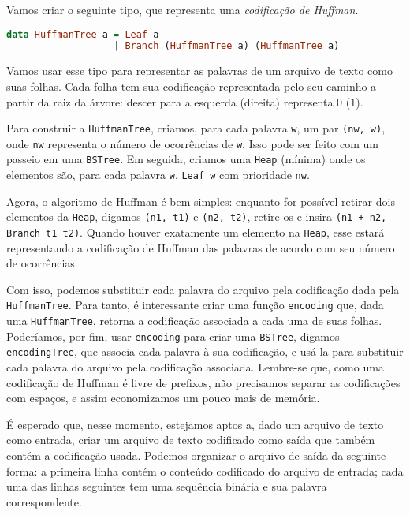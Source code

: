\documentclass[a4paper]{article}
\begin{document}
Vamos criar o seguinte tipo, que representa uma \emph{codificação de Huffman}.

\begin{lstlisting}[language=haskell, frame=single]
data HuffmanTree a = Leaf a
                   | Branch (HuffmanTree a) (HuffmanTree a)
\end{lstlisting}

Vamos usar esse tipo para representar as palavras de um arquivo de texto como suas folhas.
Cada folha tem sua codificação representada pelo seu caminho a partir da raiz da árvore:
descer para a esquerda (direita) representa $0$ ($1$).

Para construir a \texttt{HuffmanTree}, criamos, para cada palavra \texttt{w}, um par \texttt{(nw, w)}, onde \texttt{nw} representa o número de ocorrências de \texttt{w}.
Isso pode ser feito com um passeio em uma \texttt{BSTree}.
Em seguida, criamos uma \texttt{Heap} (mínima) onde os elementos são, para cada palavra \texttt{w}, \texttt{Leaf w} com prioridade \texttt{nw}.

Agora, o algoritmo de Huffman é bem simples: enquanto for possível retirar dois elementos da \texttt{Heap}, digamos \texttt{(n1, t1)} e \texttt{(n2, t2)}, retire-os e insira \texttt{(n1 + n2, Branch t1 t2)}.
Quando houver exatamente um elemento na \texttt{Heap}, esse estará representando a codificação de Huffman das palavras de acordo com seu número de ocorrências.

Com isso, podemos substituir cada palavra do arquivo pela codificação dada pela \texttt{HuffmanTree}.
Para tanto, é interessante criar uma função \texttt{encoding} que, dada uma \texttt{HuffmanTree}, retorna a codificação associada a cada uma de suas folhas.
Poderíamos, por fim, usar \texttt{encoding} para criar uma \texttt{BSTree}, digamos \texttt{encodingTree}, que associa cada palavra à sua codificação, e usá-la para substituir cada palavra do arquivo pela codificação associada.
Lembre-se que, como uma codificação de Huffman é livre de prefixos, não precisamos separar as codificações com espaços, e assim economizamos um pouco mais de memória.

É esperado que, nesse momento, estejamos aptos a, dado um arquivo de texto como entrada, criar um arquivo de texto codificado como saída que também contém a codificação usada.
Podemos organizar o arquivo de saída da seguinte forma:
a primeira linha contém o conteúdo codificado do arquivo de entrada;
cada uma das linhas seguintes tem uma sequência binária e sua palavra correspondente.
\end{document}
